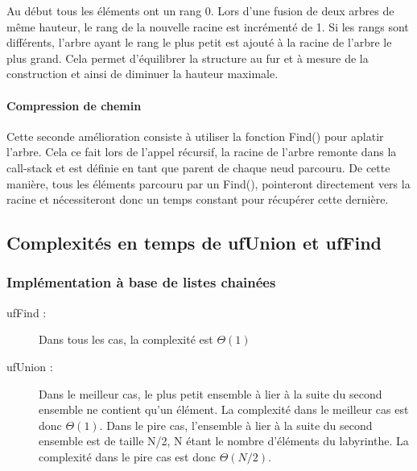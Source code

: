 \documentclass[10pt]{article}
\begin{document}
	Au début tous les éléments ont un rang 0. Lors d'une fusion de deux arbres de même hauteur, le rang de la nouvelle racine est incrémenté de 1. Si les rangs sont différents, l'arbre ayant le rang le plus petit est ajouté à la racine de l'arbre le plus grand. Cela permet d'équilibrer la structure au fur et à mesure de la construction et ainsi de diminuer la hauteur maximale.
	
	\paragraph{Compression de chemin}
	Cette seconde amélioration consiste à utiliser la fonction Find() pour aplatir l'arbre. Cela ce fait lors de l'appel récursif, la racine de l'arbre remonte dans la call-stack et est définie en tant que parent de chaque neud parcouru. De cette manière, tous les éléments parcouru par un Find(), pointeront directement vers la racine et nécessiteront donc un temps constant pour récupérer cette dernière.

\subsection{Complexités en temps de ufUnion et ufFind}

\subsubsection{Implémentation à base de listes chainées}

\begin{description}
\item[ufFind :] Dans tous les cas, la complexité est $\Theta(1)$
\item[ufUnion :] Dans le meilleur cas, le plus petit ensemble à lier à la suite du second ensemble ne contient qu'un élément. La complexité dans le meilleur cas est donc $\Theta(1)$. Dans le pire cas, l'ensemble à lier à la suite du second ensemble est de taille N/2, N étant le nombre d'éléments du labyrinthe. La complexité dans le pire cas est donc $\Theta(N/2)$.
\end{description}
\end{document}
